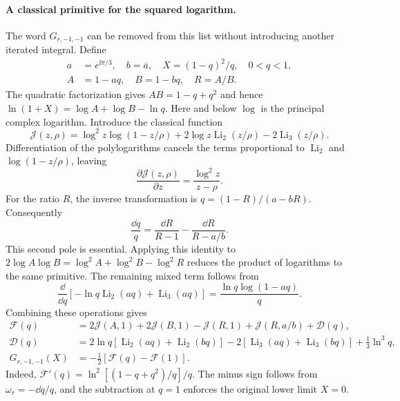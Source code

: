 \paragraph{A classical primitive for the squared logarithm.}
The word $G_{r,-1,-1}$ can be removed from this list without
introducing another iterated integral. Define
\begin{align}
 a&=e^{\ii\pi/3},\quad b=\overline a,\quad X=(1-q)^2/q,\quad 0<q<1,\\
 A&=1-aq,\quad B=1-bq,\quad R=A/B.
\end{align}
The quadratic factorization gives $AB=1-q+q^2$ and hence
$\ln(1+X)=\log A+\log B-\ln q$.
Here and below $\log$ is the principal complex logarithm.
Introduce the classical function
\begin{equation}
 \mathcal J(z,\rho)=\log^2z\log(1-z/\rho)
 +2\log z\operatorname{Li}_2(z/\rho)
 -2\operatorname{Li}_3(z/\rho).
\end{equation}
Differentiation of the polylogarithms cancels the terms proportional
to $\operatorname{Li}_2$ and $\log(1-z/\rho)$, leaving
\begin{equation}
 \frac{\partial\mathcal J(z,\rho)}{\partial z}
 =\frac{\log^2 z}{z-\rho}.
\end{equation}
For the ratio $R$, the inverse transformation is
$q=(1-R)/(a-bR)$. Consequently
\begin{equation}
 \frac{\dd q}{q}=\frac{\dd R}{R-1}
                   -\frac{\dd R}{R-a/b}.
\end{equation}
This second pole is essential. Applying this identity to
$2\log A\log B=\log^2A+\log^2B-\log^2R$ reduces the
product of logarithms to the same primitive. The remaining mixed
term follows from
\begin{equation}
 \frac{\dd}{\dd q}\left[-\ln q\operatorname{Li}_2(aq)
                  +\operatorname{Li}_3(aq)\right]
 =\frac{\ln q\log(1-aq)}q.
\end{equation}
Combining these operations gives
\begin{align}
 \mathcal F(q)&=2\mathcal J(A,1)+2\mathcal J(B,1)
                  -\mathcal J(R,1)+\mathcal J(R,a/b)
                  +\mathcal D(q),\\
 \mathcal D(q)&=2\ln q\left[\operatorname{Li}_2(aq)
                         +\operatorname{Li}_2(bq)\right]
 -2\left[\operatorname{Li}_3(aq)+\operatorname{Li}_3(bq)\right]
 +\frac13\ln^3q,\\
 G_{r,-1,-1}(X)&=-\frac12\left[\mathcal F(q)-\mathcal F(1)\right].
 \label{eq:comp-root-squared-classical}
\end{align}
Indeed, $\mathcal F'(q)=\ln^2[(1-q+q^2)/q]/q$.
The minus sign follows from $\omega_r=-\dd q/q$, and the
subtraction at $q=1$ enforces the original lower limit $X=0$.

